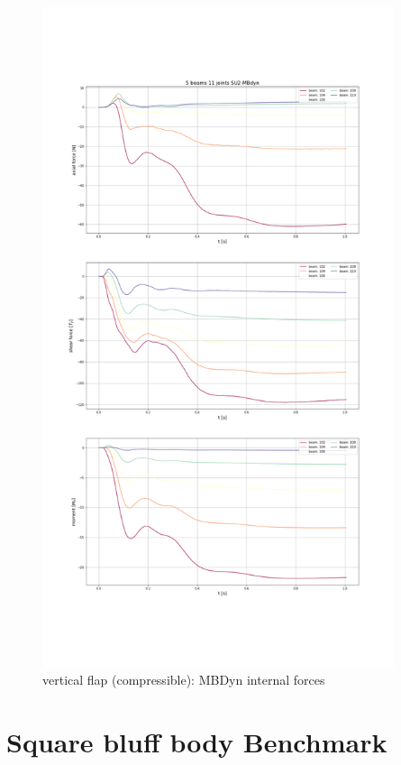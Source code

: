 \begin{figure}[htbp!]
	\centering
	\includegraphics[width=0.92\textwidth, trim=0 230 0 230, clip]{images/comp_flap/vert-flap_SU2-MBDyn_act.png}
	\caption{vertical flap (compressible): MBDyn internal forces}
	\label{fig:comp_mbd_internal}
\end{figure}


\newpage


\section{Square bluff body Benchmark}
\label{sec:sq-cyl-bench}

